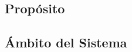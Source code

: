 \documentclass{article}
\begin{document}






    \subsection{Propósito}





    \subsection{Ámbito del Sistema}









\end{document}
